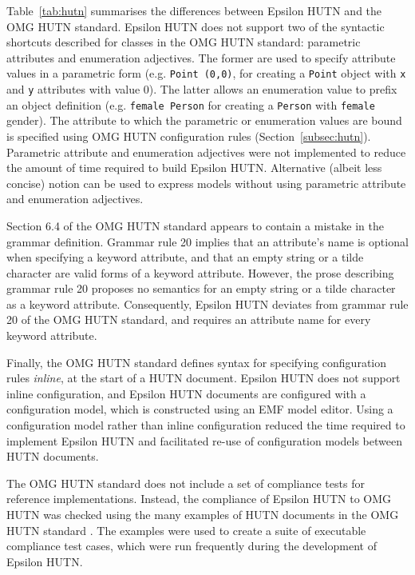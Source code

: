 Table~\ref{tab:hutn} summarises the differences between Epsilon HUTN and the OMG HUTN standard. Epsilon HUTN does not support two of the syntactic shortcuts described for classes in the OMG HUTN standard: parametric attributes and enumeration adjectives. The former are used to specify attribute values in a parametric form (e.g. \texttt{Point (0,0)}, for creating a \texttt{Po\-i\-nt} object with \texttt{x} and \texttt{y} attributes with value 0). The latter allows an enumeration value to prefix an object definition (e.g. \texttt{female Person} for creating a \texttt{Pe\-rs\-on} with \texttt{fe\-ma\-le} gender). The attribute to which the parametric or enumeration values are bound is specified using OMG HUTN configuration rules (Section~\ref{subsec:hutn}). Parametric attribute and enumeration adjectives were not implemented to reduce the amount of time required to build Epsilon HUTN. Alternative (albeit less concise) notion can be used to express models without using parametric attribute and enumeration adjectives.

Section 6.4 of the OMG HUTN standard \cite{hutn} appears to contain a mistake in the grammar definition. Grammar rule 20 implies that an attribute's name is optional when specifying a keyword attribute, and that an empty string or a tilde character are valid forms of a keyword attribute. However, the prose describing grammar rule 20 proposes no semantics for an empty string or a tilde character as a keyword attribute. Consequently, Epsilon HUTN deviates from grammar rule 20 of the OMG HUTN standard, and requires an attribute name for every keyword attribute.

Finally, the OMG HUTN standard defines syntax for specifying configuration rules \emph{inline}, at the start of a HUTN document. Epsilon HUTN does not support inline configuration, and Epsilon HUTN documents are configured with a configuration model, which is constructed using an EMF model editor. Using a configuration model rather than inline configuration reduced the time required to implement Epsilon HUTN and facilitated re-use of configuration models between HUTN documents.

The OMG HUTN standard does not include a set of compliance tests for reference implementations. Instead, the compliance of Epsilon HUTN to OMG HUTN was checked using the many examples of HUTN documents in the OMG HUTN standard \cite{hutn}. The examples were used to create a suite of executable compliance test cases, which were run frequently during the development of Epsilon HUTN.
 

